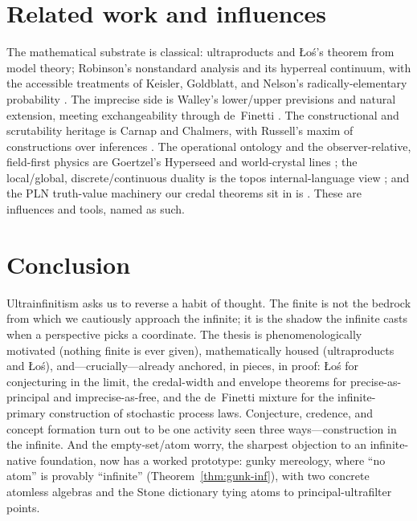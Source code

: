 \documentclass[]{article}
\theoremstyle{definition}
\theoremstyle{remark}
\begin{document}
\section{Related work and influences}
\label{sec:related}

The mathematical substrate is classical: ultraproducts and {\L}o\'s's theorem from
model theory; Robinson's nonstandard analysis and its hyperreal continuum, with the
accessible treatments of Keisler, Goldblatt, and Nelson's radically-elementary
probability \cite{Robinson1966, Keisler, Goldblatt1998, Nelson1987}. The imprecise
side is Walley's lower/upper previsions and natural extension, meeting exchangeability
through de~Finetti \cite{Walley1991, deFinetti1974, definetti1937}. The
constructional and scrutability heritage is Carnap and Chalmers, with Russell's
maxim of constructions over inferences \cite{Carnap1928, Chalmers2012, Russell1914}.
The operational ontology and the observer-relative, field-first physics are
Goertzel's Hyperseed and world-crystal lines \cite{GoertzelHyperseed,
GoertzelWorldCrystal, GoertzelObserverRelative}; the local/global, discrete/continuous
duality is the topos internal-language view \cite{MacLaneMoerdijk1992}; and the
PLN truth-value machinery our credal theorems sit in is \cite{Goertzel2008PLN}. These
are influences and tools, named as such.

\section{Conclusion}
\label{sec:conclusion}

Ultrainfinitism asks us to reverse a habit of thought. The finite is not the bedrock
from which we cautiously approach the infinite; it is the shadow the infinite casts
when a perspective picks a coordinate. The thesis is phenomenologically motivated
(nothing finite is ever given), mathematically housed (ultraproducts and {\L}o\'s),
and---crucially---already anchored, in pieces, in proof: {\L}o\'s for conjecturing in
the limit, the credal-width and envelope theorems for precise-as-principal and
imprecise-as-free, and the de~Finetti mixture for the infinite-primary construction
of stochastic process laws. Conjecture, credence, and concept formation turn out to
be one activity seen three ways---construction in the infinite. And the
empty-set/atom worry, the sharpest objection to an infinite-native foundation, now has
a worked prototype: gunky mereology, where ``no atom'' is provably ``infinite''
(Theorem~\ref{thm:gunk-inf}), with two concrete atomless algebras and the Stone
dictionary tying atoms to principal-ultrafilter points.
\end{document}
